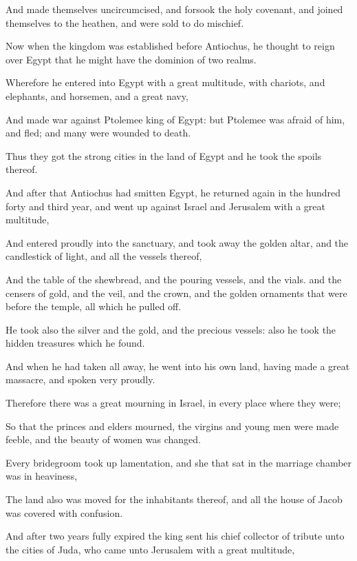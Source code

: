 {\par }{\PP {}And made themselves uncircumcised, and forsook the holy covenant, and joined themselves to the heathen, and were sold to do mischief.
\par }{\PP {}Now when the kingdom was established before Antiochus, he thought to reign over Egypt that he might have the dominion of two realms.
\par }{\PP {}Wherefore he entered into Egypt with a great multitude, with chariots, and elephants, and horsemen, and a great navy,
\par }{\PP {}And made war against Ptolemee king of Egypt: but Ptolemee was afraid of him, and fled; and many were wounded to death.
\par }{\PP {}Thus they got the strong cities in the land of Egypt and he took the spoils thereof.
\par }{\PP {}And after that Antiochus had smitten Egypt, he returned again in the hundred forty and third year, and went up against Israel and Jerusalem with a great multitude,
\par }{\PP {}And entered proudly into the sanctuary, and took away the golden altar, and the candlestick of light, and all the vessels thereof,
\par }{\PP {}And the table of the shewbread, and the pouring vessels, and the vials. and the censers of gold, and the veil, and the crown, and the golden ornaments that were before the temple, all which he pulled off.
\par }{\PP {}He took also the silver and the gold, and the precious vessels: also he took the hidden treasures which he found.
\par }{\PP {}And when he had taken all away, he went into his own land, having made a great massacre, and spoken very proudly.
\par }{\PP {}Therefore there was a great mourning in Israel, in every place where they were;
\par }{\PP {}So that the princes and elders mourned, the virgins and young men were made feeble, and the beauty of women was changed.
\par }{\PP {}Every bridegroom took up lamentation, and she that sat in the marriage chamber was in heaviness,
\par }{\PP {}The land also was moved for the inhabitants thereof, and all the house of Jacob was covered with confusion.
\par }{\PP {}And after two years fully expired the king sent his chief collector of tribute unto the cities of Juda, who came unto Jerusalem with a great multitude,
}
